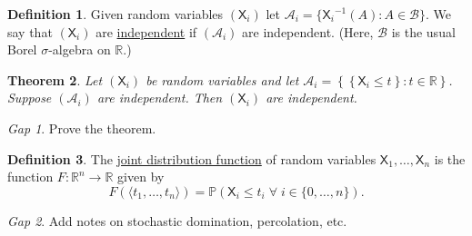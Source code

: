 \documentclass[11pt]{article}
\newcommand{\col}[1]{\mathscr{#1}}
\newcommand{\rv}[1]{\mathsf{#1}}
\newcommand{\p}{\mathbb{P}}
\newcommand{\bor}{\col{B}}
\newcommand{\defname}[1]{\underline{#1}}
\newcommand{\RR}{\mathbb{R}}
\theoremstyle{theorem}
\newtheorem{theorem}{Theorem}[section]
\theoremstyle{definition}
\newtheorem{definition}[theorem]{Definition}
\theoremstyle{remark}
\theoremstyle{step}
\theoremstyle{gap}
\newtheorem*{gap}{Gap}
\begin{document}
\begin{definition}
Given random variables \((\rv{X}_i)\) let \(\col{A}_i = \{{\rv{X}_i}^{-1}(A) : A \in \bor\}\). We say that \((\rv{X}_i)\) are \defname{independent} if \((\col{A}_i)\) are independent. (Here, \(\bor\) is the usual Borel \(\sigma\)-algebra on \(\RR\).)
\end{definition}

\begin{theorem}
Let \((\rv{X}_i)\) be random variables and let \(\col{A}_i = \left\{\left\{\rv{X}_i \leq t\right\} : t \in \RR\right\}\). Suppose \((\col{A}_i)\) are independent. Then \((\rv{X}_i)\) are independent.
\end{theorem}

\begin{gap}
Prove the theorem.
\end{gap}

\begin{definition}
The \defname{joint distribution function} of random variables \(\rv{X}_1, \ldots, \rv{X}_n\) is the function \(F:\RR^n \to \RR\) given by \[F\left(\langle t_1, \ldots, t_n\rangle\right) = \p \left(\rv{X}_i \leq t_i \;\forall\; i \in \{0, \ldots, n\}\right).\]
\end{definition}


\begin{gap}
Add notes on stochastic domination, percolation, etc.
\end{gap}
\end{document}

